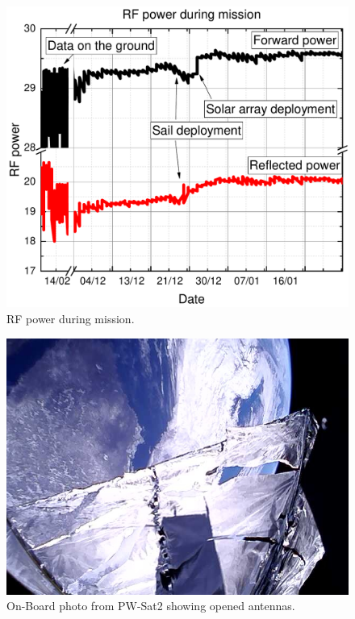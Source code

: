 \begin{figure}
    \centering
    \includegraphics[width=0.6\paperwidth]{img/4/rf_power_comm.pdf}
    \caption{RF power during mission.}
    \label{4_rf_power_comm}
\end{figure}

\begin{figure}
    \centering
    \includegraphics[width=0.7\paperwidth]{img/4/antennas_deployed_orbit.jpg}
    \caption{On-Board photo from PW-Sat2 showing opened antennas.}
    \label{antennas_deployed_orbit}
\end{figure}


